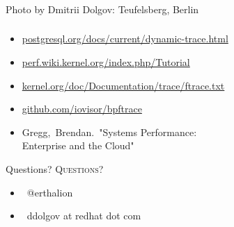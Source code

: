 \documentclass[usenames,dvipsnames, 18pt, compress, aspectratio=169]{beamer}
\def\twitter{{\faTwitter}}
\def\email{{\faEnvelope}}
\begin{document}
\begin{frame}
    \frametitle{}
    \begin{center}
            {Photo by Dmitrii Dolgov: Teufelsberg, Berlin}

    \end{center}
\end{frame}

\renewcommand\UrlFont{\color{black}\rmfamily}
\begin{frame}[fragile]{}
    \frametitle{}
    \begin{center}
        \begin{itemize}[label={}]
            \item {\url{postgresql.org/docs/current/dynamic-trace.html}}
            \item {\url{perf.wiki.kernel.org/index.php/Tutorial}}
            \item {\url{kernel.org/doc/Documentation/trace/ftrace.txt}}
            \item {\url{github.com/iovisor/bpftrace}}
            \item {Gregg, Brendan. "Systems Performance: \\ Enterprise and the Cloud"}
        \end{itemize}
    \end{center}
\end{frame}

\fontsize{18pt}{18}\selectfont
\begin{frame}
  \vspace*{2.5cm}
  \begin{minipage}[b][\paperheight]{\textwidth}
  \begin{center}

      \linespread{1.0}%
      \if@noSmallCapitals%
        Questions?
      \else%
        \scshape{\color{black} Questions?}%
      \fi%
      \vspace*{0.3em}

      \fontsize{13pt}{14}\selectfont
        \begin{itemize}[label={}]
            \item {\color{black} \twitter\ @erthalion}
            \item {\color{black} \email\ ddolgov at redhat dot com}
        \end{itemize}
      \vspace*{2.5em}%

    \vfill
    \vspace*{2em}
  \end{center}
  \end{minipage}

\end{frame}
\end{document}
